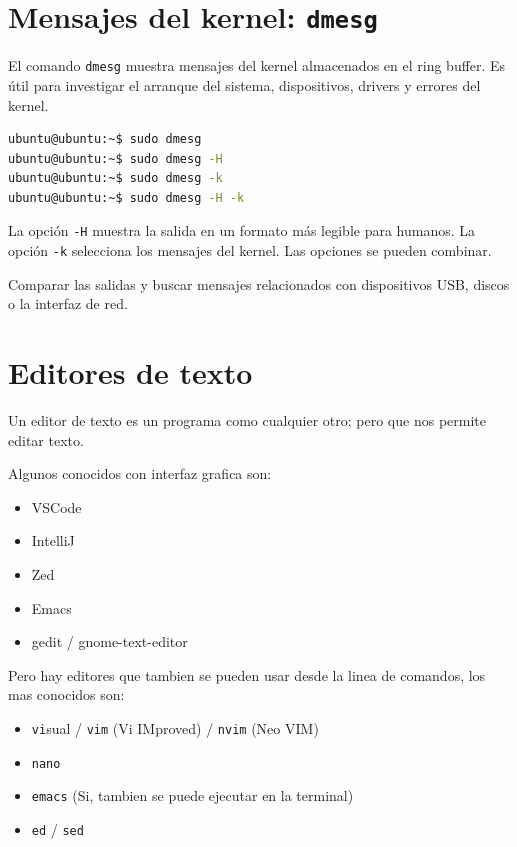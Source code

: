 \documentclass[11pt,a4paper]{article}
\begin{document}
\section{Mensajes del kernel: \texttt{dmesg}}

El comando \lstinline!dmesg! muestra mensajes del kernel almacenados en el ring buffer. Es útil para investigar el arranque del sistema, dispositivos, drivers y errores del kernel.

\begin{lstlisting}[language=bash]
ubuntu@ubuntu:~$ sudo dmesg
ubuntu@ubuntu:~$ sudo dmesg -H
ubuntu@ubuntu:~$ sudo dmesg -k
ubuntu@ubuntu:~$ sudo dmesg -H -k
\end{lstlisting}

La opción \lstinline!-H! muestra la salida en un formato más legible para humanos. La opción \lstinline!-k! selecciona los mensajes del kernel. Las opciones se pueden combinar.

\begin{infobox}
Comparar las salidas y buscar mensajes relacionados con dispositivos USB, discos o la interfaz de red.
\end{infobox}

\section{Editores de texto}

Un editor de texto es un programa como cualquier otro; pero que nos permite editar texto.

Algunos conocidos con interfaz grafica son:
\begin{itemize}[nosep]
  \item VSCode
  \item IntelliJ
  \item Zed
  \item Emacs
  \item gedit / gnome-text-editor
\end{itemize}

Pero hay editores que tambien se pueden usar desde la linea de comandos, los mas conocidos son:
\begin{itemize}[nosep]
  \item \lstinline!vi!sual / \lstinline!vim! (Vi IMproved) / \lstinline!nvim! (Neo VIM)
  \item \lstinline!nano!
  \item \lstinline!emacs! (Si, tambien se puede ejecutar en la terminal)
  \item \lstinline!ed! / \lstinline!sed!
\end{itemize}
\end{document}
